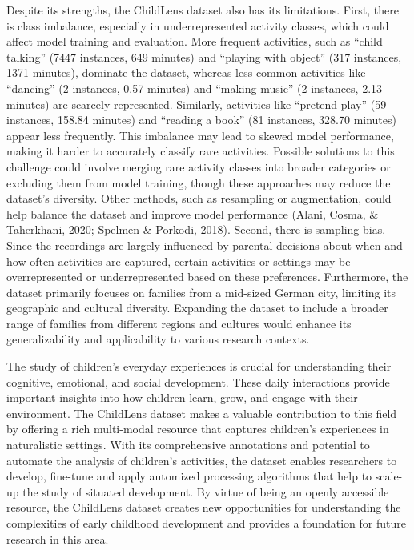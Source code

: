 \documentclass[
  man,floatsintext]{apa6}
\begin{document}
Despite its strengths, the ChildLens dataset also has its limitations. First, there is class imbalance, especially in underrepresented activity classes, which could affect model training and evaluation. More frequent activities, such as ``child talking'' (7447 instances, 649 minutes) and ``playing with object'' (317 instances, 1371 minutes), dominate the dataset, whereas less common activities like ``dancing'' (2 instances, 0.57 minutes) and ``making music'' (2 instances, 2.13 minutes) are scarcely represented. Similarly, activities like ``pretend play'' (59 instances, 158.84 minutes) and ``reading a book'' (81 instances, 328.70 minutes) appear less frequently. This imbalance may lead to skewed model performance, making it harder to accurately classify rare activities. Possible solutions to this challenge could involve merging rare activity classes into broader categories or excluding them from model training, though these approaches may reduce the dataset's diversity. Other methods, such as resampling or augmentation, could help balance the dataset and improve model performance (Alani, Cosma, \& Taherkhani, 2020; Spelmen \& Porkodi, 2018). Second, there is sampling bias. Since the recordings are largely influenced by parental decisions about when and how often activities are captured, certain activities or settings may be overrepresented or underrepresented based on these preferences. Furthermore, the dataset primarily focuses on families from a mid-sized German city, limiting its geographic and cultural diversity. Expanding the dataset to include a broader range of families from different regions and cultures would enhance its generalizability and applicability to various research contexts.

The study of children's everyday experiences is crucial for understanding their cognitive, emotional, and social development. These daily interactions provide important insights into how children learn, grow, and engage with their environment. The ChildLens dataset makes a valuable contribution to this field by offering a rich multi-modal resource that captures children's experiences in naturalistic settings. With its comprehensive annotations and potential to automate the analysis of children's activities, the dataset enables researchers to develop, fine-tune and apply automized processing algorithms that help to scale-up the study of situated development. By virtue of being an openly accessible resource, the ChildLens dataset creates new opportunities for understanding the complexities of early childhood development and provides a foundation for future research in this area.
\end{document}
